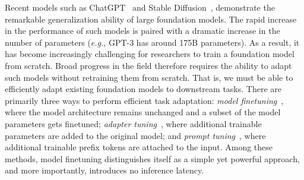 \documentclass{article} %
\newcommand{\eg}{\emph{e.g.}}
\begin{document}
Recent models such as ChatGPT~\cite{brown2020language,chen2021evaluating} and Stable Diffusion~\cite{rombach2022high}, demonstrate the remarkable generalization ability of large foundation models. The rapid increase in the performance of such models is paired with a dramatic increase in the number of parameters
(\eg, GPT-3 has around 175B parameters). As a result, it has become increasingly challenging for researchers to train a foundation model from scratch. Broad progress in the field therefore requires the ability to adapt such models without retraining them from scratch. %
That is, we must be able  %
to efficiently adapt existing foundation models to downstream tasks. There are primarily three ways to perform efficient task adaptation: \emph{model finetuning}~\cite{hulora2022,zaken2022bitfit,guo2020parameter,raffel2020exploring,qiu2023controlling,zhang2022adaptive,chavan2023one}, where the model architecture remains unchanged and a subset of the model parameters gets finetuned; \emph{adapter tuning}~\cite{rebuffi2017learning,houlsby2019parameter,pfeiffer2020adapterfusion,lin2020exploring,he2021towards}, where additional trainable parameters are added to the original model; and \emph{prompt tuning}~\cite{li2021prefix,lester2021power}, where additional trainable prefix tokens are attached to the input. Among these methods, model finetuning distinguishes itself as a simple yet powerful approach, and more importantly, introduces no inference latency.

\vspace{-0.6mm}
\end{document}
